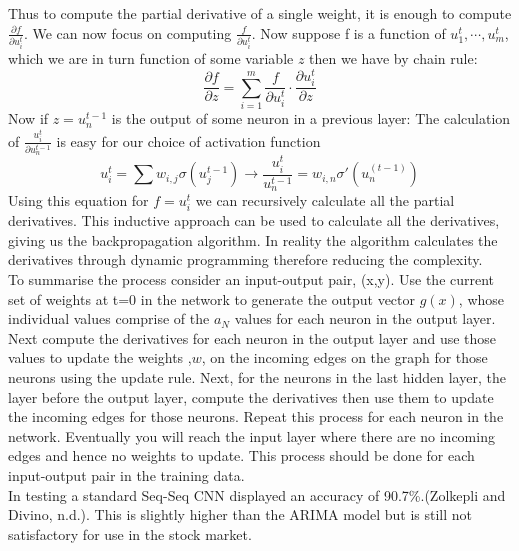 \documentclass{article}
\begin{document}
Thus to compute the partial derivative of a single weight, it is enough to compute $\frac{\partial f}{\partial u_i^t}$.
We can now focus on computing $\frac{f}{\partial u_i^t}$. Now suppose f is a function of $u_1^t, \cdots, u_m^t$, which we are in turn function of some variable $z$ then we have by chain rule:
$$\frac{\partial f}{\partial z} = \sum_{i=1}^{m}\frac{f}{\partial u_i^t}\cdot \frac{\partial u_i^t}{\partial z}$$
Now if $z = u_n^{t-1}$ is the output of some neuron in a previous layer: The calculation of $\frac{u_i^t}{\partial u_n^{t-1}}$ is easy for our choice of activation function
$$u_i^t = \sum w_{i,j}\sigma(u_j^{t-1}) \rightarrow \frac{u_i^t}{u_n^{t-1}} = w_{i,n}\sigma'(u_n^(t-1))$$
Using this equation for $f= u_i^t$ we can recursively calculate all the partial derivatives. This inductive approach can be used to calculate all the derivatives, giving us the backpropagation algorithm. In reality the algorithm calculates the derivatives through dynamic programming therefore reducing the complexity.\\
To summarise the process consider an input-output pair, (x,y). Use the current set of weights at
t=0 in the network to generate the output vector $g(x)$, whose individual values comprise of the $a_N$
values for each neuron in the output layer. Next compute the derivatives for each neuron in the
output layer and use those values to update the weights ,$w$, on the incoming edges on the graph
for those neurons using the update rule. Next, for the neurons in the last hidden layer, the layer
before the output layer, compute the derivatives then use them to update the incoming edges for
those neurons. Repeat this process for each neuron in the network. Eventually you will reach the
input layer where there are no incoming edges and hence no weights to update.
This process should be done for each input-output pair in the training data.\\
In testing a standard Seq-Seq CNN displayed an accuracy of 90.7\%.(Zolkepli and Divino, n.d.).
This is slightly higher than the ARIMA model but is still not satisfactory for use in the stock
market.
\end{document}
